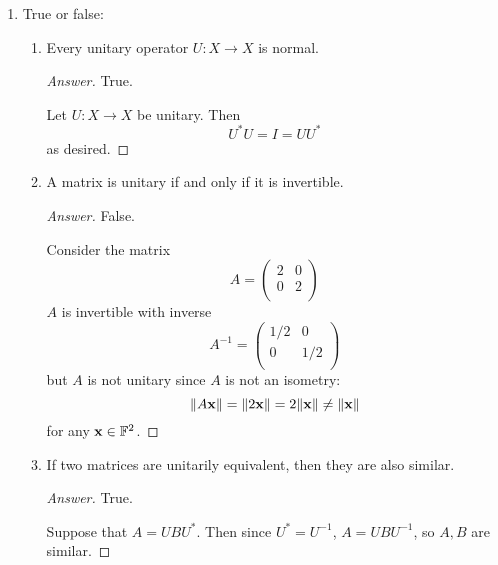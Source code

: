 \documentclass[../psets.tex]{subfiles}
\begin{document}
\begin{enumerate}[label={\textbf{2.\arabic*.}}]
    \item True or false:
    \begin{enumerate}
        \item Every unitary operator $U:X\to X$ is normal.
        \begin{proof}[Answer]
            True.\par
            Let $U:X\to X$ be unitary. Then
            \begin{equation*}
                U^*U = I = UU^*
            \end{equation*}
            as desired.
        \end{proof}
        \item A matrix is unitary if and only if it is invertible.
        \begin{proof}[Answer]
            False.\par
            Consider the matrix
            \begin{equation*}
                A =
                \begin{pmatrix}
                    2 & 0\\
                    0 & 2\\
                \end{pmatrix}
            \end{equation*}
            $A$ is invertible with inverse
            \begin{equation*}
                A^{-1} =
                \begin{pmatrix}
                    1/2 & 0\\
                    0 & 1/2\\
                \end{pmatrix}
            \end{equation*}
            but $A$ is not unitary since $A$ is not an isometry:
            \begin{equation*}
                \norm{A\mathbf{x}} = \norm{2\mathbf{x}} = 2\norm{\mathbf{x}} \neq \norm{\mathbf{x}}
            \end{equation*}
            for any $\mathbf{x}\in\mathbb{F}^2$.
        \end{proof}
        \item If two matrices are unitarily equivalent, then they are also similar.
        \begin{proof}[Answer]
            True.\par
            Suppose that $A=UBU^*$. Then since $U^*=U^{-1}$, $A=UBU^{-1}$, so $A,B$ are similar.

\end{proof}
\end{enumerate}
\end{enumerate}
\end{document}
